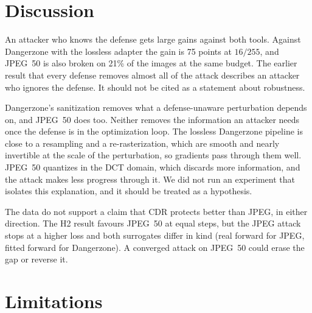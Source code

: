 \documentclass[11pt]{article}
\begin{document}
\section{Discussion}

An attacker who knows the defense gets large gains against both tools. Against Dangerzone
with the lossless adapter the gain is 75 points at $16/255$, and JPEG~50 is also broken on
21\% of the images at the same budget. The earlier result that every defense removes almost
all of the attack describes an attacker who ignores the defense. It should not be cited as a
statement about robustness.

Dangerzone's sanitization removes what a defense-unaware perturbation depends on, and
JPEG~50 does too. Neither removes the information an attacker needs once the defense is in
the optimization loop. The lossless Dangerzone pipeline is close to a resampling and a
re-rasterization, which are smooth and nearly invertible at the scale of the perturbation, so
gradients pass through them well. JPEG~50 quantizes in the DCT domain, which discards more
information, and the attack makes less progress through it. We did not run an experiment
that isolates this explanation, and it should be treated as a hypothesis.

The data do not support a claim that CDR protects better than JPEG, in either direction. The
H2 result favours JPEG~50 at equal steps, but the JPEG attack stops at a higher loss and both
surrogates differ in kind (real forward for JPEG, fitted forward for Dangerzone). A
converged attack on JPEG~50 could erase the gap or reverse it.

\section{Limitations}
\label{sec:limits}
\end{document}
